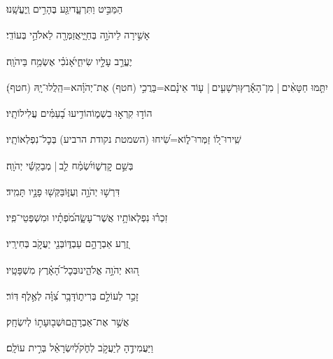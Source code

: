 \documentclass[12pt]{article}
\newcommand{\loc}[1]{\textsuperscript{\locf{#1}}}
\begin{document}
{\loc{ לב}~}‏הַמַּבִּ֣יט  וַתִּרְעָ֑ד{\hfill}יִגַּ֖ע בֶּהָרִ֣ים וְֽיֶעֱשָֽׁנוּ׃\par

{\loc{ לג}~}‏אָשִׁ֣ירָה לַיהֹוָ֣ה בְּחַיָּ֑י{\hfill}אֲזַמְּרָ֖ה לֵאלֹהַ֣י בְּעוֹדִֽי׃\par

{\loc{ לד}~}‏יֶעֱרַ֣ב עָלָ֣יו שִׂיחִ֑י{\hfill}אָ֝נֹכִ֗י אֶשְׂמַ֥ח בַּיהֹוָֽה׃\par

{\loc{ לה}~}‏יִתַּ֤מּוּ חַטָּאִ֨ים |  מִן־הָאָ֡רֶץ{\hfill}וּרְשָׁעִ֤ים |  ע֤וֹד אֵינָ֗ם\newline\hspace*{.5em}א=בָּרֲכִ֣י (חטף)  אֶת־יְהֹוָ֗ה{\hfill}א=הַֽלֲלוּ־יָֽהּ (חטף)׃\par\pend
\ledpb
\pstart[\subsection*{\textcolor{red}{פרק קה}}]\label{פרק קה}
{\loc{ א}~}‏הוֹד֣וּ  קִרְא֣וּ בִשְׁמ֑וֹ{\hfill}הוֹדִ֥יעוּ בָ֝עַמִּ֗ים עֲלִילוֹתָֽיו׃\par

{\loc{ ב}~}‏שִֽׁירוּ־ל֭וֹ זַמְּרוּ־ל֑וֹ{\hfill}א=שִׂ֝יחוּ (השמטת נקודת הרביע) בְּכׇל־נִפְלְאוֹתָֽיו׃\par

{\loc{ ג}~}‏ בְּשֵׁ֣ם קׇדְשׁ֑וֹ{\hfill}יִ֝שְׂמַ֗ח לֵ֤ב |  מְבַקְשֵׁ֬י יְהֹוָֽה׃\par

{\loc{ ד}~}‏דִּרְשׁ֣וּ יְהֹוָ֣ה וְעֻזּ֑וֹ{\hfill}בַּקְּשׁ֖וּ פָנָ֣יו תָּמִֽיד׃\par

{\loc{ ה}~}‏זִכְר֗וּ נִפְלְאוֹתָ֥יו אֲשֶׁר־עָשָׂ֑ה{\hfill}מֹ֝פְתָ֗יו וּמִשְׁפְּטֵי־פִֽיו׃\par

{\loc{ ו}~}‏זֶ֭רַע אַבְרָהָ֣ם עַבְדּ֑וֹ{\hfill}בְּנֵ֖י יַעֲקֹ֣ב בְּחִירָֽיו׃\par

{\loc{ ז}~}‏ה֭וּא יְהֹוָ֣ה אֱלֹהֵ֑ינוּ{\hfill}בְּכׇל־הָ֝אָ֗רֶץ מִשְׁפָּטָֽיו׃\par

{\loc{ ח}~}‏זָכַ֣ר לְעוֹלָ֣ם בְּרִית֑וֹ{\hfill}דָּבָ֥ר צִ֝וָּ֗ה לְאֶ֣לֶף דּֽוֹר׃\par

{\loc{ ט}~}‏אֲשֶׁ֣ר  אֶת־אַבְרָהָ֑ם{\hfill}וּשְׁב֖וּעָת֣וֹ לְיִשְׂחָֽק׃\par

{\loc{ י}~}‏וַיַּעֲמִידֶ֣הָ לְיַעֲקֹ֣ב לְחֹ֑ק{\hfill}לְ֝יִשְׂרָאֵ֗ל בְּרִ֣ית עוֹלָֽם׃\par
\end{document}

